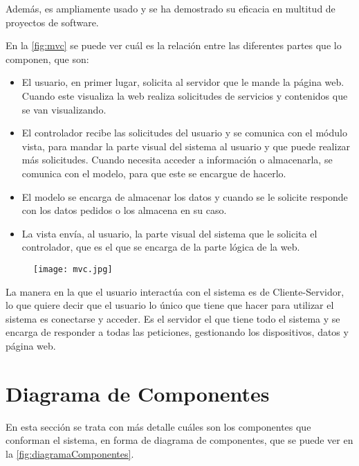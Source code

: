 Además, es ampliamente usado y se ha demostrado su eficacia en multitud de proyectos de software.
\pagebreak

En la \autoref{fig:mvc} se puede ver cuál es la relación entre las diferentes partes que lo componen, que son:
\begin{itemize}
	\item El usuario, en primer lugar, solicita al servidor que le mande la página web. Cuando este visualiza la web realiza solicitudes de servicios y contenidos que se van visualizando.
	\item El controlador recibe las solicitudes del usuario y se comunica con el módulo vista, para mandar la parte visual del sistema al usuario y que puede realizar más solicitudes. Cuando necesita acceder a información o almacenarla, se comunica con el modelo, para que este se encargue de hacerlo.
	\item El modelo se encarga de almacenar los datos y cuando se le solicite responde con los datos pedidos o los almacena en su caso.
	\item La vista envía, al usuario, la parte visual del sistema que le solicita el controlador, que es el que se encarga de la parte lógica de la web.
\end{itemize}

\begin{figure}[H]
	{\texttt{[image: mvc.jpg]}}
\end{figure}

La manera en la que el usuario interactúa con el sistema es de Cliente-Servidor, lo que quiere decir que el usuario lo único que tiene que hacer para utilizar el sistema es conectarse y acceder. Es el servidor el que tiene todo el sistema y se encarga de responder a todas las peticiones, gestionando los dispositivos, datos y página web. 
\pagebreak

\section{Diagrama de Componentes}\label{sec:diagramaComponentes}
En esta sección se trata con más detalle cuáles son los componentes que conforman el sistema, en forma de diagrama de componentes, que se puede ver en la \autoref{fig:diagramaComponentes}.

